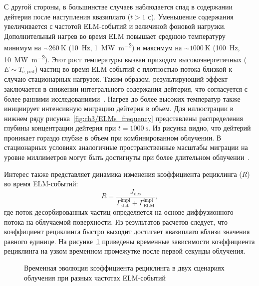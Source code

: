 С другой стороны, в большинстве случаев наблюдается спад в содержании дейтерия после наступления квазиплато ($t>1$ с). Уменьшение содержания увеличивается с частотой ELM-событий и величиной фоновой нагрузки. Дополнительный нагрев во время ELM повышает среднюю температуру минимум на $\sim\SI{260}{\kelvin}$ (\SI{10}{\hertz}, \SI{1}{\mega\watt\per\meter\squared}) и максимум на $\sim\SI{1000}{\kelvin}$ (\SI{100}{\hertz}, \SI{10}{\mega\watt\per\meter\squared}). Этот рост температуры вызван приходом высокоэнергетичных ($E\sim T_{\mathrm{e,ped}}$) частиц во время ELM-событий с плотностью потока близкой к случаю стационарных нагрузок. Таким образом, результирующий эффект заключается в снижении интегрального содержания дейтерия, что согласуется с более ранними исследованиями~\cite{Hu2015}. Нагрев до более высоких температур также инициирует интенсивную миграцию дейтерия в объем. Для иллюстрации в нижнем ряду рисунка~\cref{fig:ch3/ELMs_frequency} представлены распределения глубины концентрации дейтерия при $t=\SI{1000}{\second}$. Из рисунка видно, что дейтерий проникает гораздо глубже в объем при комбинированном облучении. В стационарных условиях аналогичные пространственные масштабы миграции на уровне миллиметров могут быть достигнуты при более длительном облучении~\cite{Hodille2021}.

Интерес также представляет динамика изменения коэффициента рециклинга (\( R \)) во время ELM-событий:
\begin{equation}
	R = \frac{J_\mathrm{des}}{\Gamma^{\mathrm{impl}}_\mathrm{stat}+\Gamma^{\mathrm{impl}}_\mathrm{ELM}},
\end{equation}
где поток десорбированных частиц определяется на основе диффузионного потока на облучаемой поверхности. Из результатов расчетов следует, что коэффициент рециклинга быстро выходит достигает квазиплато вблизи значения равного единице. На рисунке~\cref{fig:ch3/R_freq} приведены временные зависимости коэффициента рециклинга на узком временном промежутке после первой секунды облучения.   
\begin{figure}[ht]
	\caption{Временная эволюция коэффициента рециклинга в двух сценариях облучения при разных частотах ELM-событий}\label{fig:ch3/R_freq}
\end{figure}

